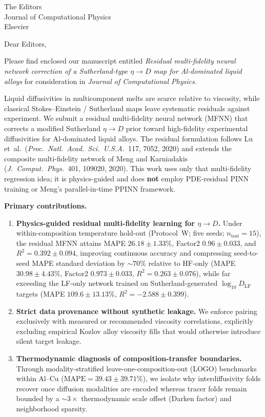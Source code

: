 \documentclass[11pt]{letter}
\begin{document}
\begin{letter}{The Editors\\Journal of Computational Physics\\Elsevier}

\opening{Dear Editors,}

Please find enclosed our manuscript entitled
\textit{Residual multi-fidelity neural network correction of a Sutherland-type $\eta\to D$ map for Al-dominated liquid alloys}
for consideration in \textit{Journal of Computational Physics}.

Liquid diffusivities in multicomponent melts are scarce relative to viscosity, while classical Stokes--Einstein / Sutherland maps leave systematic residuals against experiment. We submit a residual multi-fidelity neural network (MFNN) that corrects a modified Sutherland $\eta\to D$ prior toward high-fidelity experimental diffusivities for Al-dominated liquid alloys. The residual formulation follows Lu et~al.\ (\textit{Proc.\ Natl.\ Acad.\ Sci.\ U.S.A.}\ 117, 7052, 2020) and extends the composite multi-fidelity network of Meng and Karniadakis (\textit{J.\ Comput.\ Phys.}\ 401, 109020, 2020). This work uses only that multi-fidelity regression idea; it is physics-guided and does \textbf{not} employ PDE-residual PINN training or Meng's parallel-in-time PPINN framework.

\textbf{Primary contributions.}
\begin{enumerate}
\item \textbf{Physics-guided residual multi-fidelity learning for $\eta\to D$.}
Under within-composition temperature hold-out (Protocol~W; five seeds; $n_{\mathrm{test}}=15$), the residual MFNN attains MAPE $26.18\pm 1.33\%$, Factor2 $0.96\pm 0.033$, and $R^2=0.392\pm 0.094$, improving continuous accuracy and compressing seed-to-seed MAPE standard deviation by $\sim 70\%$ relative to HF-only (MAPE $30.98\pm 4.43\%$, Factor2 $0.973\pm 0.033$, $R^2=0.263\pm 0.076$), while far exceeding the LF-only network trained on Sutherland-generated $\log_{10} D_{\mathrm{LF}}$ targets (MAPE $109.6\pm 13.13\%$, $R^2=-2.588\pm 0.399$).
\item \textbf{Strict data provenance without synthetic leakage.}
We enforce pairing exclusively with measured or recommended viscosity correlations, explicitly excluding empirical Kozlov alloy viscosity fills that would otherwise introduce silent target leakage.
\item \textbf{Thermodynamic diagnosis of composition-transfer boundaries.}
Through modality-stratified leave-one-composition-out (LOGO) benchmarks within Al--Cu ($\mathrm{MAPE}=39.43\pm 39.71\%$), we isolate why interdiffusivity folds recover once diffusion modalities are encoded whereas tracer folds remain bounded by a $\sim 3\times$ thermodynamic scale offset (Darken factor) and neighborhood sparsity.
\end{enumerate}


\end{letter}
\end{document}

